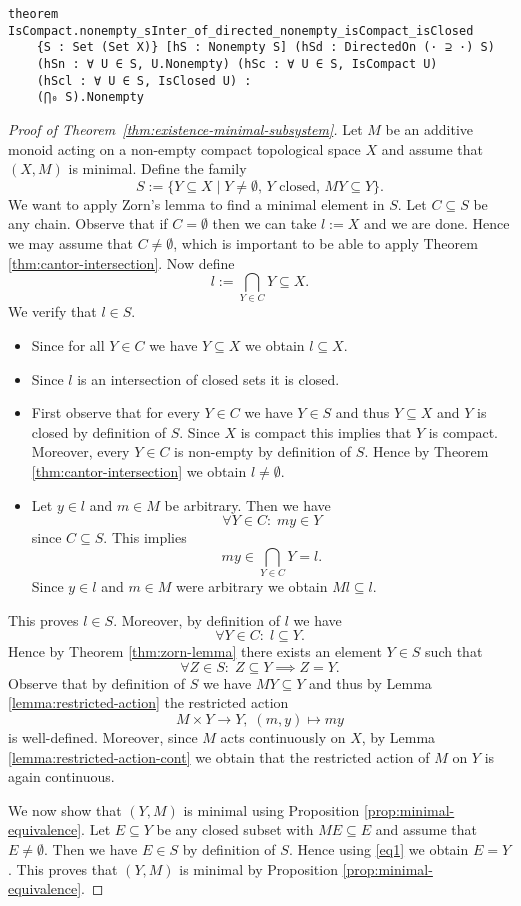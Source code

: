 \documentclass[11pt]{article}
\theoremstyle{definition}              %
\theoremstyle{definition}              %
\theoremstyle{definition}              %
\begin{document}
\begin{lstlisting}
theorem IsCompact.nonempty_sInter_of_directed_nonempty_isCompact_isClosed
    {S : Set (Set X)} [hS : Nonempty S] (hSd : DirectedOn (· ⊇ ·) S) 
    (hSn : ∀ U ∈ S, U.Nonempty) (hSc : ∀ U ∈ S, IsCompact U) 
    (hScl : ∀ U ∈ S, IsClosed U) : 
    (⋂₀ S).Nonempty 
\end{lstlisting}

\begin{proof}[Proof of Theorem~\ref{thm:existence-minimal-subsystem}]
Let $M$ be an additive monoid acting on a non-empty compact topological space $X$ and 
assume that $(X, M)$ is minimal. Define the family 
\[
S := \{ Y \subseteq X \mid Y \neq \emptyset, \, Y \text{ closed}, \, M Y \subseteq Y \}.
\]
We want to apply Zorn's lemma to find a minimal element in $S$. 
Let $C \subseteq S$ be any chain.
Observe that if $C = \emptyset$ then we can take $l := X$ and we are done. Hence we may assume that $C \neq \emptyset$,
which is important to be able to apply Theorem \ref{thm:cantor-intersection}.
Now define
\[
l := \bigcap_{Y \in C} Y \subseteq X.
\]
We verify that $l \in S$. 

\begin{itemize}
  \item Since for all $Y \in C$ we have $Y \subseteq X$ we obtain $l \subseteq X$. 
  \item Since $l$ is an intersection of closed sets it is closed. 
  \item First observe that for every $Y \in C$ we have $Y \in S$ and thus $Y \subseteq X$ and $Y$ is closed 
    by definition of $S$. Since $X$ is compact this implies that $Y$ is compact. 
    Moreover, every $Y \in C$ is non-empty by definition of $S$.
    Hence by Theorem \ref{thm:cantor-intersection} we obtain $l \neq \emptyset$. 
  \item Let $y \in l$ and $m \in M$ be arbitrary. Then we have 
    \[
    \forall Y \in C: \; m y \in Y
    \]
    since $C \subseteq S$. This implies 
    \[
    m y \in \bigcap_{Y \in C} Y = l.  
    \]
    Since $y \in l$ and $m \in M$ were arbitrary we obtain $M l \subseteq l$.
\end{itemize}

This proves $l \in S$. Moreover, by definition of $l$ we have 
\[
\forall Y \in C: \; l \subseteq Y.
\]
Hence by Theorem \ref{thm:zorn-lemma} there exists an element $Y \in S$ such that 
\[
\forall Z \in S: \; Z \subseteq Y \implies Z = Y. \tag{1}
\]
Observe that by definition of $S$ we have $M Y \subseteq Y$ and thus by Lemma \ref{lemma:restricted-action}
the restricted action 
\[
M \times Y \to Y, \; (m, y) \mapsto m y
\]
is well-defined. Moreover, since $M$ acts continuously on $X$, by Lemma \ref{lemma:restricted-action-cont} 
we obtain that the restricted action of $M$ on $Y$ is again continuous. 

We now show that $(Y, M)$ is minimal using Proposition \ref{prop:minimal-equivalence}. 
Let $E \subseteq Y$ be any closed subset with $M E \subseteq E$ and assume that $E \neq \emptyset$. 
Then we have $E \in S$ by definition of $S$. Hence using \eqref{eq1} we obtain $E = Y$. 
This proves that $(Y, M)$ is minimal by Proposition \ref{prop:minimal-equivalence}.
\end{proof}
\end{document}
